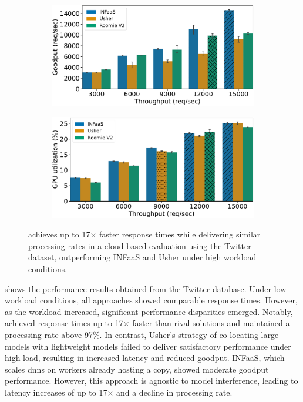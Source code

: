 \begin{figure}[h!]
	\begin{subfigure}[b]{0.45\textwidth}
		\centering
		\includegraphics[width=\textwidth]{chapters/roomie/images/NvidiaA100/twitter-all-models/goodput.pdf}
	\end{subfigure}
	\hfill
	\begin{subfigure}[b]{0.45\textwidth}
		\centering
		\includegraphics[width=\textwidth]{chapters/roomie/images/NvidiaA100/twitter-all-models/gpu_utilization.pdf}
	\end{subfigure}
	
	\caption{\roomie{} achieves up to 17$\times$ faster response times while delivering similar processing rates in a cloud-based evaluation using the Twitter dataset, outperforming INFaaS and Usher under high workload conditions.}
	\label{fig:NvidiaA100/twitter-all-models}
\end{figure}


 shows the performance results obtained from the Twitter database. Under low workload conditions, all approaches showed comparable response times. However, as the workload increased, significant performance disparities emerged. Notably,~\roomie{} achieved response times up to 17× faster than rival solutions and maintained a processing rate above 97\%. In contrast, Usher's strategy of co-locating large models with lightweight models failed to deliver satisfactory performance under high load, resulting in increased latency and reduced goodput. INFaaS, which scales \acrshort{dnn}s on workers already hosting a copy, showed moderate goodput performance. However, this approach is agnostic to model interference, leading to latency increases of up to 17× and a decline in processing rate.

